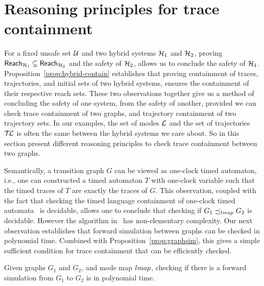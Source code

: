 
\section{Reasoning principles for trace containment}
\label{sec:trace-containment}

For a fixed unsafe set ${\mathcal U}$ and two hybrid systems ${\mathcal H}_1$ and ${\mathcal H}_2$,
proving $\reach{\H_1} \subseteq \reach{\H_2}$ and the safety of
${\mathcal H}_2$, allows us to conclude the safety of
${\mathcal H}_1$. Proposition~\ref{prop:hybrid-contain} establishes that proving
containment of traces, trajectories, and initial sets of two hybrid
systems, ensures the containment of their respective reach sets. These
two observations together give us a method of concluding the safety of
one system, from the safety of another, provided we can check trace
containment of two graphs, and trajectory containment of two
trajectory sets. In our examples, the set of modes ${\mathcal L}$ and the set of trajectories $\mathcal{T\mkern-3mu L}$ is often the same between the hybrid systems we care about. So in this section present different reasoning principles to check trace containment between two graphs.

Semantically, a transition graph $G$ can be viewed as one-clock timed automaton, i.e., one can constructed a timed automaton $T$ with
one-clock variable such that the timed traces of $T$ are exactly the
traces of $G$. This observation, coupled with the fact that checking
the timed language containment of one-clock timed
automata~\cite{ow-lics} is decidable, allows one to conclude that
checking if $G_1 \preceq_{{\sc lmap}} G_2$ is decidable. However the
algorithm in~\cite{ow-lics} has non-elementary complexity. Our next
observation establishes that forward simulation between graphs can be
checked in polynomial time. Combined with
Proposition~\ref{prop:graphsim}, this gives a simple sufficient condition for trace containment that can be efficiently checked.

\begin{proposition}
Given graphs $G_1$ and $G_2$, and mode map ${\sc lmap}$, checking if
there is a forward simulation from $G_1$ to $G_2$ is in polynomial
time.
\end{proposition}

